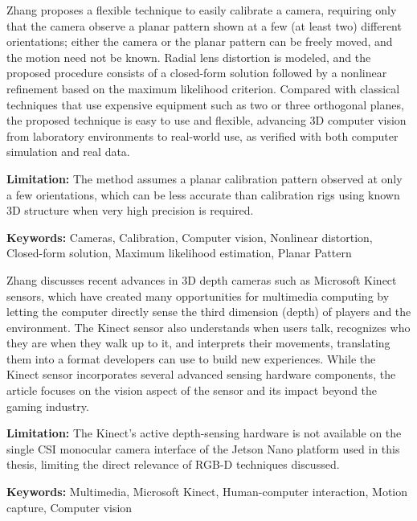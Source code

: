 {
	Zhang \cite{Zhang:2000} proposes a flexible technique to easily calibrate a camera, requiring only that the camera observe a planar pattern shown at a few (at least two) different orientations; either the camera or the planar pattern can be freely moved, and the motion need not be known. Radial lens distortion is modeled, and the proposed procedure consists of a closed-form solution followed by a nonlinear refinement based on the maximum likelihood criterion. Compared with classical techniques that use expensive equipment such as two or three orthogonal planes, the proposed technique is easy to use and flexible, advancing 3D computer vision from laboratory environments to real-world use, as verified with both computer simulation and real data.
	
	\bigskip
	\textbf{Limitation:} The method assumes a planar calibration pattern observed at only a few orientations, which can be less accurate than calibration rigs using known 3D structure when very high precision is required.
	
	\scriptsize{\textbf{Keywords:} Cameras, Calibration, Computer vision, Nonlinear distortion, Closed-form solution, Maximum likelihood estimation, Planar Pattern}
}

{
	Zhang \cite{Zhang:2012} discusses recent advances in 3D depth cameras such as Microsoft Kinect sensors, which have created many opportunities for multimedia computing by letting the computer directly sense the third dimension (depth) of players and the environment. The Kinect sensor also understands when users talk, recognizes who they are when they walk up to it, and interprets their movements, translating them into a format developers can use to build new experiences. While the Kinect sensor incorporates several advanced sensing hardware components, the article focuses on the vision aspect of the sensor and its impact beyond the gaming industry.
	
	\bigskip
	\textbf{Limitation:} The Kinect's active depth-sensing hardware is not available on the single CSI monocular camera interface of the Jetson Nano platform used in this thesis, limiting the direct relevance of RGB-D techniques discussed.
	
	\scriptsize{\textbf{Keywords:} Multimedia, Microsoft Kinect, Human-computer interaction, Motion capture, Computer vision}
}

